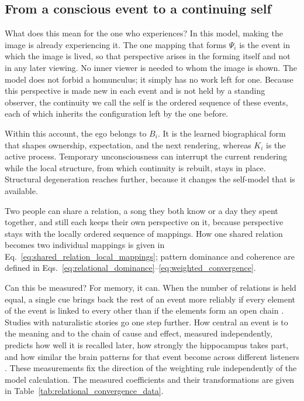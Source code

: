 \subsection{From a conscious event to a continuing self}
\label{sec:self}

What does this mean for the one who experiences? In this model, making the image is
already experiencing it. The one mapping that
forms $\Psi_i$ is the event in which the image is lived, so that perspective arises
in the forming itself and not in any later viewing. No inner viewer is needed to whom
the image is shown. The model does not forbid a homunculus; it simply has no work
left for one. Because this perspective is made
new in each event and is not held by a standing observer, the continuity we call the
self is the ordered sequence of these events, each of which inherits the
configuration left by the one before.

Within this account, the ego belongs to $B_i$. It is the learned biographical form
that shapes ownership, expectation, and the next rendering, whereas $K_i$ is the
active process. Temporary unconsciousness can interrupt the current rendering while
the local structure, from which continuity is rebuilt, stays in place. Structural
degeneration reaches further, because it changes the self-model that is available.

Two people can share a relation, a song they both know or a day they spent together,
and still each keeps their own perspective on it, because perspective stays with the
locally ordered sequence of mappings. How one shared relation becomes two individual
mappings is given in Eq.~\eqref{eq:shared_relation_local_mappings}; pattern dominance
and coherence are defined in
Eqs.~\eqref{eq:relational_dominance}--\eqref{eq:weighted_convergence}.

Can this be measured? For memory, it can. When the number of relations is held equal,
a single cue brings back the rest of an event more reliably if every element of the
event is linked to every other than if the elements form an open chain
\citep{horner2015}. Studies with naturalistic stories go one step further. How
central an event is to the meaning and to the chain of cause and effect, measured
independently, predicts how well it is recalled later, how strongly the hippocampus
takes part, and how similar the brain patterns for that event become across
different listeners \citep{leechen2022}. These measurements fix the direction of the
weighting rule independently of the model calculation. The measured coefficients and
their transformations are given in Table~\ref{tab:relational_convergence_data}.

